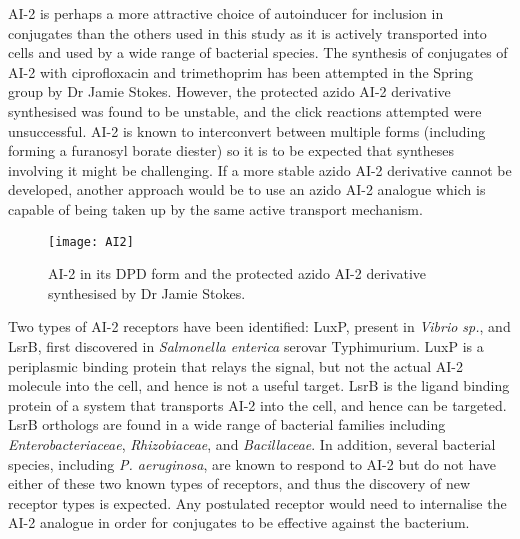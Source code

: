 
AI-2  is perhaps a more attractive choice of autoinducer for inclusion in conjugates than the others used in this study as it is actively transported into cells\cite{Taga2003} and used by a wide range of bacterial species\cite{Pereira2013}.
The synthesis of conjugates of AI-2  with ciprofloxacin  and trimethoprim  has been attempted in the Spring group by Dr Jamie Stokes. However, the protected azido AI-2 derivative  synthesised was found to be unstable, and the click reactions attempted were unsuccessful\cite{Stokes2017}. AI-2  is known to interconvert between multiple forms (including forming a furanosyl borate diester)\cite{Guo2015} so it is to be expected that syntheses involving it might be challenging. If a more stable azido AI-2 derivative cannot be developed, another approach would be to use an azido AI-2  analogue which is capable of being taken up by the same active transport mechanism. 

\begin{figure}[H]
	\begin{center}
		\texttt{[image: AI2]}
		\caption{AI-2  in its DPD form and the protected azido AI-2 derivative  synthesised by Dr Jamie Stokes.
		\label{fgr:AI2}} 
	\end{center}
\end{figure}

Two types of AI-2  receptors have been identified: LuxP, present in \textit{Vibrio sp.}\cite{Chen2002}, and LsrB, first discovered in \textit{Salmonella enterica} serovar Typhimurium\cite{Miller2004}. 
LuxP is a periplasmic binding protein that relays the signal, but not the actual AI-2  molecule into the cell, and hence is not a useful target.\cite{Neiditch2005}
LsrB is the ligand binding protein of a system that transports AI-2  into the cell\cite{Taga2003}, and hence can be targeted. LsrB orthologs are found in a wide range of bacterial families including \textit{Enterobacteriaceae}, \textit{Rhizobiaceae}, and \textit{Bacillaceae}\cite{Pereira2009}.
In addition, several bacterial species, including \textit{P. aeruginosa}, are known to respond to AI-2  but do not have either of these two known types of receptors, and thus the discovery of new receptor types is expected\cite{Pereira2009}. Any postulated receptor would need to internalise the AI-2 analogue in order for conjugates to be effective against the bacterium.

